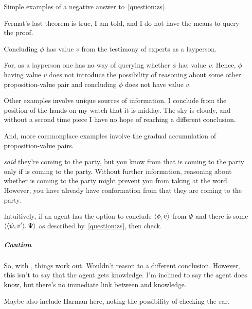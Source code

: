 \begin{note}[Success]
  Simple examples of a negative answer to~\ref{question:zs}.

  \begin{illustration}
    Fermat's last theorem is true, I am told, and I do not have the means to query the proof.

    Concluding \(\phi\) has value \(v\) from the testimony of experts as a layperson.
  \end{illustration}

  For, as a layperson one has no way of querying whether \(\phi\) has value \(v\).
  Hence, \(\phi\) having value \(v\) does not introduce the possibility of reasoning about some other proposition-value pair and concluding \(\phi\) does not have value \(v\).

  Other examples involve unique sources of information.
  I conclude from the position of the hands on my watch that it is midday.
  The sky is cloudy, and without a second time piece I have no hope of reaching a different conclusion.
\end{note}

\begin{note}
  And, more commonplace examples involve the gradual accumulation of proposition-value pairs.

  \begin{illustration}
     \emph{said} they're coming to the party, but you know from  that  is coming to the party only if  is coming to the party. Without further information, reasoning about whether  is coming to the party might prevent you from taking  at the word. However, you have already have conformation from  that they are coming to the party.
  \end{illustration}
\end{note}

\begin{note}
  Intuitively, if an agent has the option to conclude \(\langle \phi, v \rangle\) from \(\Phi\) and there is some \(\langle \langle \psi, v' \rangle, \Psi \rangle\) as described by~\autoref{question:zs}, then check.
\end{note}

\subparagraph{Caution}

\begin{note}
  So, with \citeauthor{Dretske:1970to}, things work out.
  Wouldn't reason to a different conclusion.
  However, this isn't to say that the agent gets knowledge.
  I'm inclined to say the agent does know, but there's no immediate link between \qzS{} and knowledge.

  Maybe also include Harman here, noting the possibility of checking the car.
\end{note}


